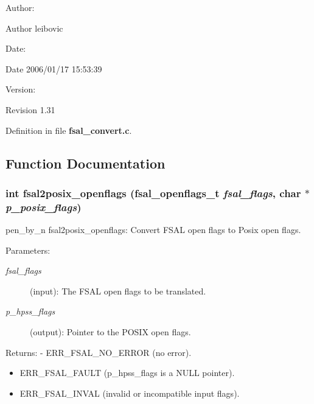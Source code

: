 \begin{Desc}
\item[Author:]\end{Desc}
\begin{Desc}
\item[Author]leibovic \end{Desc}
\begin{Desc}
\item[Date:]\end{Desc}
\begin{Desc}
\item[Date]2006/01/17 15:53:39 \end{Desc}
\begin{Desc}
\item[Version:]\end{Desc}
\begin{Desc}
\item[Revision]1.31 \end{Desc}


Definition in file {\bf fsal\_\-convert.c}.

\subsection{Function Documentation}
\subsubsection[{fsal2posix\_\-openflags}]{\setlength{\rightskip}{0pt plus 5cm}int fsal2posix\_\-openflags (fsal\_\-openflags\_\-t {\em fsal\_\-flags}, \/  char $\ast$ {\em p\_\-posix\_\-flags})}\label{fsal__convert_8c_d6abc88341bcfc03ff48c1ea7e78166d}


pen\_\-by\_\-n fsal2posix\_\-openflags: Convert FSAL open flags to Posix open flags.

\begin{Desc}
\item[Parameters:]
\begin{description}
\item[{\em fsal\_\-flags}](input): The FSAL open flags to be translated. \item[{\em p\_\-hpss\_\-flags}](output): Pointer to the POSIX open flags.\end{description}
\end{Desc}
\begin{Desc}
\item[Returns:]- ERR\_\-FSAL\_\-NO\_\-ERROR (no error).\begin{itemize}
\item ERR\_\-FSAL\_\-FAULT (p\_\-hpss\_\-flags is a NULL pointer).\item ERR\_\-FSAL\_\-INVAL (invalid or incompatible input flags). \end{itemize}
\end{Desc}


